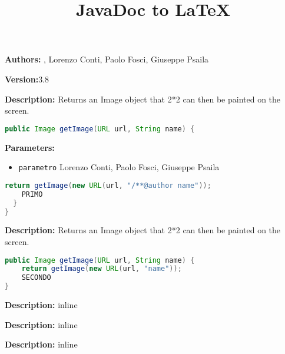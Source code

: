 \documentclass{article}
\title{JavaDoc to LaTeX}
\begin{document}
\textbf{Authors:} , Lorenzo Conti,  Paolo Fosci,  Giuseppe Psaila

\textbf{Version:}3.8 

\textbf{Description:}
Returns an Image object that 2*2 can then be painted on the screen.

\begin{lstlisting}[language=Java]
public Image getImage(URL url, String name) {
\end{lstlisting}
\textbf{Parameters:}
\begin{itemize}
  \item\texttt{parametro} Lorenzo Conti, Paolo Fosci, Giuseppe Psaila
\end{itemize}

\begin{lstlisting}[language=Java]
    return getImage(new URL(url, "/**@author name"));
    PRIMO
  }
}
\end{lstlisting}
\textbf{Description:}
Returns an Image object that 2*2 can then be painted on the screen.

\begin{lstlisting}[language=Java]
public Image getImage(URL url, String name) {
    return getImage(new URL(url, "name"));
    SECONDO
}
\end{lstlisting}
\textbf{Description:}
inline

\textbf{Description:}
inline

\textbf{Description:}
inline
\end{document}
